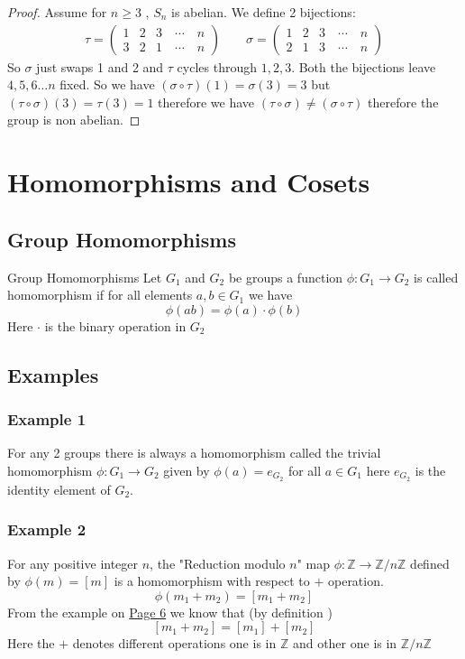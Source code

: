 \documentclass[16pt,a4paper]{article}
\theoremstyle{definition}
\begin{document}
\begin{proof}
Assume for $n\geq 3$ , $S_n$ is abelian. We define 2 bijections: 
\begin{align*}
\tau = 
\begin{pmatrix}
1 & 2 & 3 \quad\cdots \quad n \\
3 & 2 & 1 \quad \cdots \quad n
\end{pmatrix} \quad\quad
\sigma = 
\begin{pmatrix}
1 & 2 & 3 \quad\cdots \quad n \\
2 & 1 & 3 \quad \cdots \quad n
\end{pmatrix}
\end{align*}
So $\sigma$ just swaps 1 and 2 and $\tau$ cycles through $1,2,3$. Both the bijections leave $4,5,6\ldots n$ fixed. So we have $(\sigma \circ \tau)(1) = \sigma (3) = 3$ but $(\tau\circ \sigma)(3) = \tau(3) = 1$ therefore we have $(\tau \circ \sigma)\neq (\sigma \circ \tau)$ therefore the group is non abelian. 
\end{proof}



\newpage
\section{Homomorphisms and Cosets}

\subsection{Group Homomorphisms}

\begin{defn}{Group Homomorphisms}{}
Let $G_1$ and $G_2$ be groups a function $\phi: G_1 \rightarrow G_2$ is called homomorphism if for all elements $a,b\in G_1$ we have 
\[\phi(ab) = \phi(a)\cdot \phi(b)\]
Here $\cdot$ is the binary operation in $G_2$
\end{defn}
\subsection*{Examples}
\subsubsection*{Example 1}
For any 2 groups there is always a homomorphism called the trivial homomorphism $\phi : G_1 \rightarrow G_2$ given by $\phi (a) = e_{G_2}$ for all $a\in G_1$ here $e_{G_2}$ is the identity element of $G_2$.  

\subsubsection*{Example 2}
For any positive integer $n$, the "Reduction modulo $n$" map $\phi : \mathbb{Z}\rightarrow \mathbb{Z/}n\mathbb{Z}$ defined by $\phi(m) = [m]$ is a homomorphism with respect to $+$ operation. 
\[\phi(m_1+m_2) = [m_1+m_2]\] 
From the example on \hyperref[pg6]{Page 6} we know that (by definition )
\[[m_1 + m_2] = [m_1]+[m_2]\]
Here the $+$ denotes different operations one is in $\mathbb{Z}$ and other one is in $\mathbb{Z/}n\mathbb{Z}$
\end{document}
